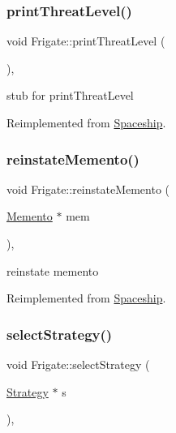 \subsubsection{\texorpdfstring{print\+Threat\+Level()}{printThreatLevel()}}
{\footnotesize\ttfamily void Frigate\+::print\+Threat\+Level (\begin{DoxyParamCaption}{ }\end{DoxyParamCaption})\hspace{0.3cm}{\ttfamily [inline]}, {\ttfamily [virtual]}}

stub for print\+Threat\+Level 

Reimplemented from \hyperlink{classSpaceship_a8f16814f888a5a1423e5a491329cdb97}{Spaceship}.

\mbox{\label{classFrigate_af6db10cd052dc5382857452dcb4e6d2a}} 
\subsubsection{\texorpdfstring{reinstate\+Memento()}{reinstateMemento()}}
{\footnotesize\ttfamily void Frigate\+::reinstate\+Memento (\begin{DoxyParamCaption}\item[{\hyperlink{classMemento}{Memento} $\ast$}]{mem }\end{DoxyParamCaption})\hspace{0.3cm}{\ttfamily [inline]}, {\ttfamily [virtual]}}

reinstate memento 

Reimplemented from \hyperlink{classSpaceship_ab075c869473344b6471c8e28ca7ea61e}{Spaceship}.

\mbox{\label{classFrigate_a484e16990cddb79fbc51ff29e815fec5}} 
\subsubsection{\texorpdfstring{select\+Strategy()}{selectStrategy()}}
{\footnotesize\ttfamily void Frigate\+::select\+Strategy (\begin{DoxyParamCaption}\item[{\hyperlink{classStrategy}{Strategy} $\ast$}]{s }\end{DoxyParamCaption})\hspace{0.3cm}{\ttfamily [inline]}, {\ttfamily [virtual]}}

